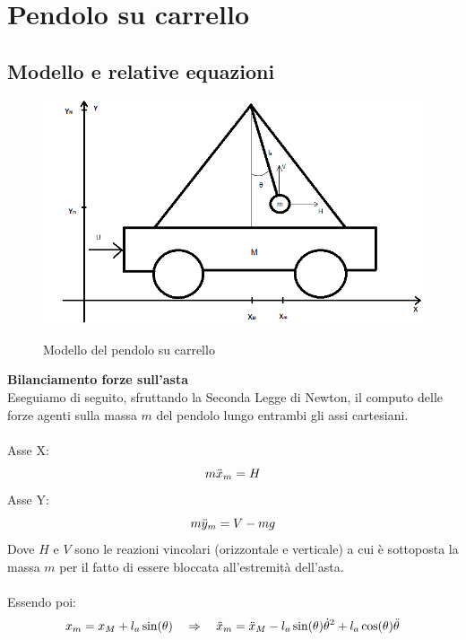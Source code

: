 \chapter{Pendolo su carrello}\label{PendCarrello}
\section{Modello e relative equazioni}\label{equazioni}
\begin{figure}[ht]
	\centering
	\includegraphics[width=\textwidth]{pendolo.png}\\
	\caption{Modello del pendolo su carrello}
	\label{pendolo}
\end{figure}
\noindent\textbf{Bilanciamento forze sull'asta}\\
Eseguiamo di seguito, sfruttando la Seconda Legge di Newton, il computo delle forze agenti sulla massa $m$ del pendolo lungo entrambi gli assi cartesiani.\\\\
Asse X:
\begin{equation}\notag
m\ddot{x}_m=H
\end{equation}
Asse Y:
\begin{equation}\notag
m\ddot{y}_m=V-mg
\end{equation}
Dove $H$ e $V$ sono le reazioni vincolari (orizzontale e verticale) a cui è sottoposta la massa $m$ per il fatto di essere bloccata all'estremità dell'asta.\\\\
Essendo poi:\\
\begin{equation}\notag
x_m = x_M+l_a\sin(\theta) \quad \Rightarrow \quad \ddot{x}_m=\ddot{x}_M-l_a\sin(\theta)\dot{\theta}^2+l_a\cos(\theta)\ddot{\theta}
\end{equation}
